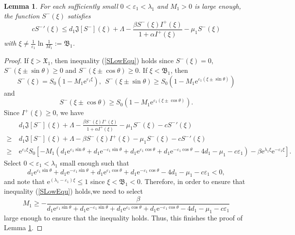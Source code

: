 \documentclass[final,3p,times]{elsarticle}
\newtheorem{lemma}{Lemma}[section]
\numberwithin{equation}{section}
\begin{document}
\begin{lemma}\label{LemLowS}
For each sufficiently small $0<\varepsilon_1<\lambda_1$ and $M_1>0$ is large enough, the function $S^-(\xi)$ satisfies
\begin{equation}\label{SLowEqu}
c{S^-}'(\xi) \leq d_1\mathfrak{J}[S^-](\xi) + \Lambda - \frac{\beta S^-(\xi)I^+(\xi)}{1+\alpha I^+(\xi)} - \mu_1 S^-(\xi)
\end{equation}
with $\xi\neq\frac{1}{\varepsilon_1}\ln\frac{1}{M_1}:=\mathfrak{B}_1$.
\end{lemma}
\begin{proof}
If $\xi>\mathfrak{X}_1$, then inequality (\ref{SLowEqu}) holds since $S^-(\xi) =0$, $S^-(\xi\pm\sin\theta) \geqslant 0$  and $S^-(\xi\pm\cos\theta) \geqslant 0$.
If $\xi<\mathfrak{B}_1$, then
\[
S^-(\xi)=S_0(1-M_1 \mathrm{e}^{\varepsilon_1 \xi}),\ \ S^-(\xi\pm\sin\theta)\geqslant S_0(1-M_1 \mathrm{e}^{\varepsilon_1 (\xi\pm\sin\theta)})
\]
and
\[
S^-(\xi\pm\cos\theta)\geqslant S_0(1-M_1 \mathrm{e}^{\varepsilon_1 (\xi\pm\cos\theta)}).
\]
Since $I^+(\xi)\geqslant 0$, we have
\begin{align*}
&\ d_1\mathfrak{J}[S^-](\xi) + \Lambda - \frac{\beta S^-(\xi)I^+(\xi)}{1+\alpha I^+(\xi)} - \mu_1 S^-(\xi) - c{S^-}'(\xi)\\
\geq &\ d_1\mathfrak{J}[S^-](\xi) + \Lambda - \beta S^-(\xi)I^+(\xi) - \mu_1 S^-(\xi) - c{S^-}'(\xi)\\
\geq &\ \mathrm{e}^{\varepsilon_1 \xi} S_0 \left[-M_1 (d_1\mathrm{e}^{\varepsilon_1\sin\theta} + d_1\mathrm{e}^{-\varepsilon_1\sin\theta} + d_1\mathrm{e}^{\varepsilon_1\cos\theta} + d_1\mathrm{e}^{-\varepsilon_1\cos\theta} - 4d_1 - \mu_1 - c \varepsilon_1) -\beta \mathrm{e}^{\lambda_1\xi}\mathrm{e}^{-\varepsilon_1\xi}\right].
\end{align*}
Select $0<\varepsilon_1<\lambda_1$ small enough such that
\[
d_1\mathrm{e}^{\varepsilon_1\sin\theta} + d_1\mathrm{e}^{-\varepsilon_1\sin\theta} + d_1\mathrm{e}^{\varepsilon_1\cos\theta} + d_1\mathrm{e}^{-\varepsilon_1\cos\theta} - 4d_1 - \mu_1 - c \varepsilon_1 < 0,
\]
and note that $\mathrm{e}^{(\lambda_1 - \varepsilon_1)\xi}\leq 1$ since $\xi<\mathfrak{B}_1<0$. Therefore, in order to ensure that inequality (\ref{SLowEqu}) holds,we need to select
\[
M_1 \geq -\frac{\beta}{d_1\mathrm{e}^{\varepsilon_1\sin\theta} + d_1\mathrm{e}^{-\varepsilon_1\sin\theta} + d_1\mathrm{e}^{\varepsilon_1\cos\theta} + d_1\mathrm{e}^{-\varepsilon_1\cos\theta} - 4d_1 - \mu_1 - c \varepsilon_1}
\]
large enough to ensure that the inequality  holds. Thus, this finishes the proof of Lemma \ref{LemLowS}.
\end{proof}
\end{document}
